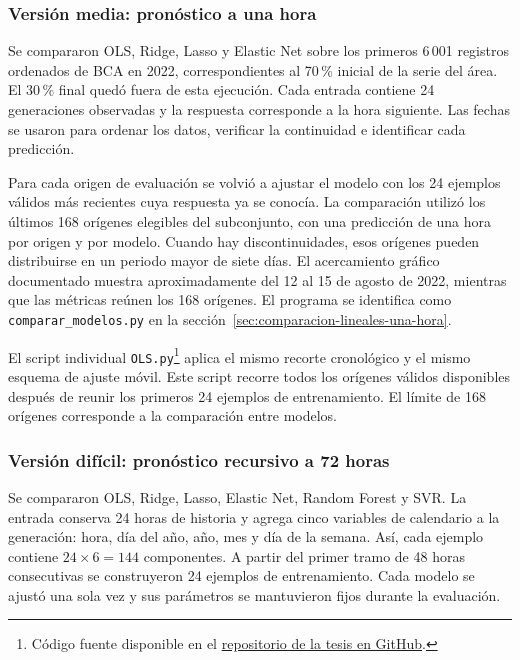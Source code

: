 \subsubsection{Versión media: pronóstico a una hora}

Se compararon OLS, Ridge, Lasso y Elastic Net sobre los primeros 6\,001 registros ordenados de BCA en 2022, correspondientes al 70\,\% inicial de la serie del área. El 30\,\% final quedó fuera de esta ejecución. Cada entrada contiene 24 generaciones observadas y la respuesta corresponde a la hora siguiente. Las fechas se usaron para ordenar los datos, verificar la continuidad e identificar cada predicción.

Para cada origen de evaluación se volvió a ajustar el modelo con los 24 ejemplos válidos más recientes cuya respuesta ya se conocía. La comparación utilizó los últimos 168 orígenes elegibles del subconjunto, con una predicción de una hora por origen y por modelo. Cuando hay discontinuidades, esos orígenes pueden distribuirse en un periodo mayor de siete días. El acercamiento gráfico documentado muestra aproximadamente del 12 al 15 de agosto de 2022, mientras que las métricas reúnen los 168 orígenes. El programa se identifica como \texttt{comparar\_modelos.py} en la sección~\ref{sec:comparacion-lineales-una-hora}.

El script individual \texttt{OLS.py}\footnote{Código fuente disponible en el \href{https://github.com/UlisesACC/Tesis_unam/tree/main/codigos\%20de\%20docker/root}{repositorio de la tesis en GitHub}.} aplica el mismo recorte cronológico y el mismo esquema de ajuste móvil. Este script recorre todos los orígenes válidos disponibles después de reunir los primeros 24 ejemplos de entrenamiento. El límite de 168 orígenes corresponde a la comparación entre modelos.

\subsubsection{Versión difícil: pronóstico recursivo a 72 horas}

Se compararon OLS, Ridge, Lasso, Elastic Net, Random Forest y SVR. La entrada conserva 24 horas de historia y agrega cinco variables de calendario a la generación: hora, día del año, año, mes y día de la semana. Así, cada ejemplo contiene \(24\times6=144\) componentes. A partir del primer tramo de 48 horas consecutivas se construyeron 24 ejemplos de entrenamiento. Cada modelo se ajustó una sola vez y sus parámetros se mantuvieron fijos durante la evaluación.

